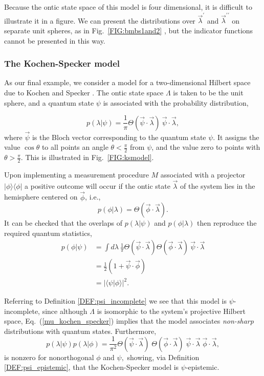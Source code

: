 \documentclass[aps,nofootinbib,12pt]{revtex4-2}
\begin{document}
Because the ontic state space of this model is four dimensional, it
is difficult to illustrate it in a figure. We can present the
distributions over $\vec{\lambda}^{\prime}$ and
$\vec{\lambda}^{\prime\prime}$ on separate unit spheres, as in
Fig.~\ref{FIG:bmbs1and2} , but the indicator functions cannot be
presented in this way.


\subsubsection{The Kochen-Specker model \label{SEC:example_ksmodel}}

As our final example, we consider a model for a two-dimensional
Hilbert space due to Kochen and Specker \cite{Ks}. The ontic state
space $\Lambda$ is taken to be the unit sphere, and a quantum state
$\psi$ is associated with the probability distribution,

\begin{equation}
p(\lambda|\psi)=\frac{1}{\pi}\Theta(\vec{\psi}\cdot\vec{\lambda})\:\vec{\psi
}\cdot\vec{\lambda}, \label{mu_kochen_specker}
\end{equation}
where $\vec{\psi}$ is the Bloch vector corresponding to the quantum
state $\psi$. It assigns the value $\cos{\theta}$ to all points an
angle $\theta<\frac{\pi}{2}$ from $\psi $, and the value zero to
points with $\theta>\frac{\pi}{2}$. This is illustrated in
Fig.~\ref{FIG:ksmodel}.

Upon implementing a measurement procedure $M$ associated with a
projector $|\phi\rangle\langle\phi|$ a positive outcome will occur
if the ontic state $\vec{\lambda}$ of the system lies in the
hemisphere centered on $\vec{\phi}$, i.e.,
\begin{equation}
p(\phi|\lambda)=\Theta(\vec{\phi}\cdot\vec{\lambda}).
\end{equation}
It can be checked that the overlaps of $p(\lambda|\psi)$ and
$p(\phi|\lambda)$ then reproduce the required quantum statistics,
\begin{align}
p(\phi|\psi)  & =\int{d}\lambda\:\frac{1}{\pi}\Theta(\vec{\psi}\cdot
\vec{\lambda})\Theta(\vec{\phi}\cdot\vec{\lambda})\:\vec{\psi}\cdot
\vec{\lambda}\nonumber\\
&  =\frac{1}{2}(1+\vec{\psi}\cdot\vec{\phi})\nonumber\\
&  =\left|  \langle\psi|\phi\rangle\right|  ^{2}.
\end{align}

Referring to Definition \ref{DEF:psi_incomplete} we see that this
model is $\psi$-incomplete, since although $\Lambda$ is isomorphic
to the system's projective Hilbert space,
Eq.~(\ref{mu_kochen_specker}) implies that the model associates
\textit{non-sharp} distributions with quantum states. Furthermore,
\[
p(\lambda|\psi)p(\lambda|\phi)=\frac{1}{\pi^{2}}\Theta(\vec{\psi}\cdot
\vec{\lambda})\;\Theta(\vec{\phi}\cdot\vec{\lambda})\;\vec{\psi}\cdot
\vec{\lambda}\;\vec{\phi}\cdot\vec{\lambda},
\]
is nonzero for nonorthogonal $\phi$ and $\psi,$ showing, via
Definition \ref{DEF:psi_epistemic}, that the Kochen-Specker model is
$\psi$-epistemic.
\end{document}

